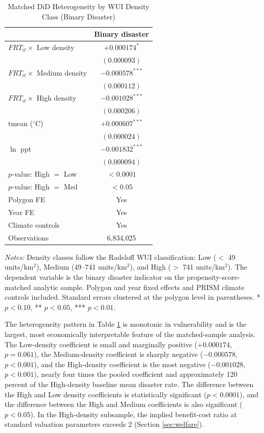 \documentclass[12pt, letterpaper]{article}
\begin{document}
\begin{table}[H]
\centering
\small
\begin{threeparttable}
\caption{Matched DiD Heterogeneity by WUI Density Class (Binary Disaster)}
\label{tab:heterogeneity}
\begin{tabular}{lc}
\toprule
& Binary disaster \\
\midrule
$FRT_{it} \times$ Low density & $+0.000174^{*}$ \\
& $(0.000093)$ \\
$FRT_{it} \times$ Medium density & $-0.000578^{***}$ \\
& $(0.000112)$ \\
$FRT_{it} \times$ High density & $-0.001028^{***}$ \\
& $(0.000206)$ \\
tmean ($^\circ$C) & $+0.000607^{***}$ \\
& $(0.000024)$ \\
$\ln$ ppt & $-0.001832^{***}$ \\
& $(0.000094)$ \\
\midrule
$p$-value: High $=$ Low & $< 0.0001$ \\
$p$-value: High $=$ Med & $< 0.05$ \\
Polygon FE & Yes \\
Year FE & Yes \\
Climate controls & Yes \\
Observations & 6{,}834{,}025 \\
\bottomrule
\end{tabular}
\begin{tablenotes}
\small
\item \textit{Notes:} Density classes follow the Radeloff WUI classification: Low ($<$ 49 units/km$^2$), Medium (49--741 units/km$^2$), and High ($>$ 741 units/km$^2$). The dependent variable is the binary disaster indicator on the propensity-score-matched analytic sample. Polygon and year fixed effects and PRISM climate controls included. Standard errors clustered at the polygon level in parentheses. * $p<0.10$, ** $p<0.05$, *** $p<0.01$.
\end{tablenotes}
\end{threeparttable}
\end{table}

The heterogeneity pattern in Table \ref{tab:heterogeneity} is monotonic in vulnerability and is the largest, most economically interpretable feature of the matched-sample analysis. The Low-density coefficient is small and marginally positive ($+0.000174$, $p = 0.061$), the Medium-density coefficient is sharply negative ($-0.000578$, $p < 0.001$), and the High-density coefficient is the most negative ($-0.001028$, $p < 0.001$), nearly four times the pooled coefficient and approximately 120 percent of the High-density baseline mean disaster rate. The difference between the High and Low density coefficients is statistically significant ($p < 0.0001$), and the difference between the High and Medium coefficients is also significant ($p < 0.05$). In the High-density subsample, the implied benefit-cost ratio at standard valuation parameters exceeds 2 (Section \ref{sec:welfare}).
\end{document}
